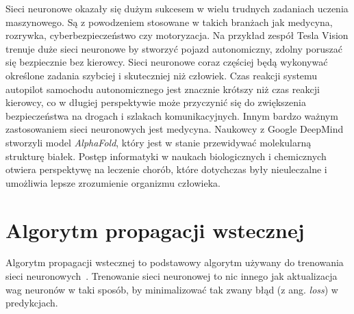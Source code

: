 Sieci neuronowe okazały się dużym sukcesem w wielu trudnych zadaniach uczenia maszynowego.
Są z powodzeniem stosowane w takich branżach jak medycyna, rozrywka, cyberbezpieczeństwo czy motoryzacja.
Na przykład zespół Tesla Vision trenuje duże sieci neuronowe by stworzyć pojazd autonomiczny, zdolny poruszać się bezpiecznie bez kierowcy.
Sieci neuronowe coraz częściej będą wykonywać określone zadania szybciej i skuteczniej niż człowiek.
Czas reakcji systemu autopilot samochodu autonomicznego jest znacznie krótszy niż czas reakcji kierowcy, co w długiej perspektywie może przyczynić się do zwiększenia bezpieczeństwa na drogach i szlakach komunikacyjnych.
Innym bardzo ważnym zastosowaniem sieci neuronowych jest medycyna.
Naukowcy z Google DeepMind stworzyli model \textit{AlphaFold}, który jest w stanie przewidywać molekularną strukturę białek.
Postęp informatyki w naukach biologicznych i chemicznych otwiera perspektywę na leczenie chorób, które dotychczas były nieuleczalne i umożliwia lepsze zrozumienie organizmu człowieka.


\section{Algorytm propagacji wstecznej}

Algorytm propagacji wstecznej to podstawowy algorytm używany do trenowania sieci neuronowych~\cite{geron}.
Trenowanie sieci neuronowej to nic innego jak aktualizacja wag neuronów w taki sposób, by minimalizować tak zwany błąd (z ang. \textit{loss}) w predykcjach.

